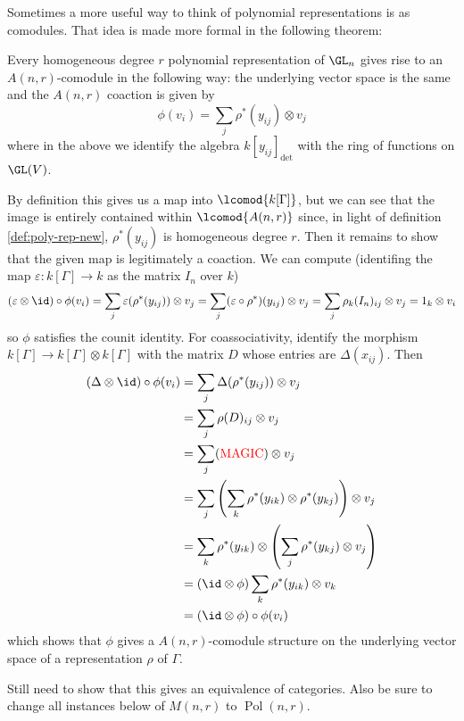 \documentclass[12pt]{article}
\DeclareMathOperator{\Pol}{Pol}
\begin{document}
Sometimes a more useful way to think of polynomial representations is as comodules. That idea is made more formal
in the following theorem:
\begin{thm}
	Every homogeneous degree $r$ polynomial representation of $\GL_n$ gives rise to an $A(n,r)$-comodule
	in the following way: the underlying vector space is the same and the $A(n,r)$ coaction is given by 
	\[\phi(v_i)=\sum_j\rho^\ast(y_{ij})\otimes v_j\]
	where in the above we identify the algebra $k[y_{ij}]_{\det}$ with the ring of functions on $\GL(V)$.
\end{thm}
\begin{prf}
	By definition this gives us a map into $\lcomod{k[\Gamma]}$, but we can see that the image is entirely contained within 
	$\lcomod{A(n,r)}$ since, in light of definition \ref{def:poly-rep-new}, $\rho^\ast(y_{ij})$ is homogeneous degree $r$.
	Then it remains to show that the given map is legitimately a coaction. We can compute (identifing the map $\varepsilon:k[\Gamma]\to k$ as the matrix $I_n$ over $k$)
	\[(\varepsilon\otimes\id)\circ\phi(v_i)=\sum_j \varepsilon(\rho^\ast(y_{ij}))\otimes v_j=\sum_j(\varepsilon\circ\rho^\ast)(y_{ij})\otimes v_j=\sum_j\rho_k(I_n)_{ij}\otimes v_j=1_k\otimes v_i\]
	so $\phi$ satisfies the counit identity. For coassociativity, identify the morphism $k[\Gamma]\to k[\Gamma]\otimes k[\Gamma]$ with the matrix $D$ whose entries are $\Delta(x_{ij})$. Then
	\begin{align*}
		(\Delta\otimes\id)\circ\phi(v_i)&=\sum_j\Delta(\rho^\ast(y_{ij}))\otimes v_j\\
		&=\sum_j\rho(D)_{ij}\otimes v_j\\
		&=\sum_j({\color{red}\text{MAGIC}})\otimes v_j\\
		&=\sum_j \left(\sum_k \rho^\ast(y_{ik})\otimes\rho^\ast(y_{kj})\right)\otimes v_j\\
		&=\sum_k \rho^\ast(y_{ik})\otimes\left(\sum_j \rho^\ast(y_{kj})\otimes v_j\right)\\
		&=(\id\otimes\phi)\sum_k\rho^\ast(y_{ik})\otimes v_k\\
		&=(\id\otimes\phi)\circ\phi(v_i)
	\end{align*}
	which shows that $\phi$ gives a $A(n,r)$-comodule structure on the underlying vector space of a representation $\rho$ of $\Gamma.$
\end{prf}

{\color{red} Still need to show that this gives an equivalence of categories. Also be sure to change all instances below of $M(n,r)$ to $\Pol(n,r)$.}
\end{document}
